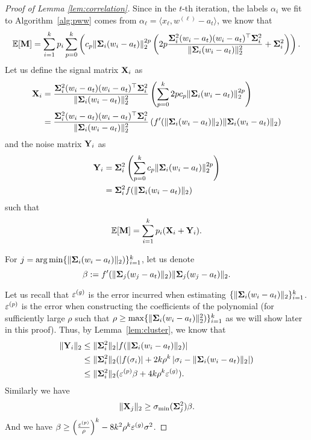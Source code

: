 \begin{proof}[Proof of Lemma \ref{lem:correlation}]
Since in the $t$-th iteration, the labels $\alpha_i$ we fit to Algorithm~\ref{alg:pww} comes from $\alpha_{\ell} = \langle x_{\ell}, w^{(\ell)} - a_t \rangle$, we know that 
\begin{align}
\mathbb{E}[\bold{M}] =  \sum_{i = 1}^k p_i    \sum_{p = 0}^k \left( c_p \| \bold{\Sigma}_i (w_i - a_t)\|_2^{2p} \left( 2p \frac{ \bold{\Sigma}_i^2 (w_i - a_t) (w_i - a_t)^{\top} \bold{\Sigma}_i^2 }{ \|\bold{\Sigma}_i (w_i - a_t) \|_2^2 }+ \bold{\Sigma}_i^2  \right) \right).
\end{align}
Let us define the signal matrix $\bold{X}_i$ as 
\begin{align}
\bold{X}_i &=   \frac{ \bold{\Sigma}_i^2 (w_i - a_t) (w_i - a_t)^{\top} \bold{\Sigma}_i^2  }{ \|\bold{\Sigma}_i (w_i - a_t) \|_2^2 }  \left( \sum_{p = 0}^k  2p c_p \| \bold{\Sigma}_i (w_i - a_t)\|_2^{2p} \right) 
\\
&= \frac{ \bold{\Sigma}_i^2 (w_i - a_t) (w_i - a_t)^{\top} \bold{\Sigma}_i^2  }{ \|\bold{\Sigma}_i (w_i - a_t) \|_2^2 }  \left( f'( \| \bold{\Sigma}_i (w_i - a_t) \|_2) \| \bold{\Sigma}_i (w_i - a_t) \|_2 \right)
\end{align}
and the noise matrix $\bold{Y}_i$ as
\begin{align}
\bold{Y}_i &=\bold{\Sigma}_i^2 \left( \sum_{p = 0}^k  c_p \| \bold{\Sigma}_i (w_i - a_t)\|_2^{2p} \right) 
\\
&= \bold{\Sigma}_i^2 f(\| \bold{\Sigma}_i (w_i - a_t)\|_2)
\end{align}
such that 
\begin{align}
\mathbb{E}[\bold{M}] = \sum_{i=1}^k p_i (\bold{X}_i + \bold{Y}_i).
\end{align}


For $j = \operatorname*{arg\,min}\{\| \bold{\Sigma}_i (w_i - a_t) \|_2) \}_{i = 1}^k$, let us denote 
$$
\beta := f'( \| \bold{\Sigma}_j (w_j - a_t) \|_2) \| \bold{\Sigma}_j (w_j - a_t) \|_2.
$$


Let us recall that $\varepsilon^{(g)}$ is the error incurred when estimating $\{\| \bold{\Sigma}_i (w_i - a_t) \|_2\}_{i = 1}^k$. $\varepsilon^{(p)}$ is the error when constructing the coefficients of the polynomial (for sufficiently large  $\rho$ such that $\rho \geq  \max\{\| \bold{\Sigma}_i (w_i - a_t) \|_2^2) \}_{i = 1}^k$ as we will show later in this proof). Thus, by Lemma~\ref{lem:cluster}, we know that 
\begin{align}
\| \bold{Y}_i \|_2& \leq \| \bold{\Sigma}_i^2 \|_2 | f(\| \bold{\Sigma}_i (w_i - a_t)\|_2)|
\\
& \leq \| \bold{\Sigma}_i^2 \|_2(| f(\sigma_i)| + 2k \rho^k \left|\sigma_i - \| \bold{\Sigma}_i (w_i - a_t)\|_2 \right| )
\\
&\leq  \| \bold{\Sigma}_i^2 \|_2 ( \varepsilon^{(p)} \beta + 4k \rho^k \varepsilon^{(g)}).
\end{align} 
Similarly we have
\begin{align}
\|\bold{X}_j\|_2 \geq \sigma_{\min}(\bold{\Sigma}_j^2) \beta.
\end{align}
And we have $\beta \geq \left(\frac{\varepsilon^{(p)}}{\rho} \right)^k - 8 k^2 \rho^k \varepsilon^{(g)} \sigma^2$.  



\end{proof}
